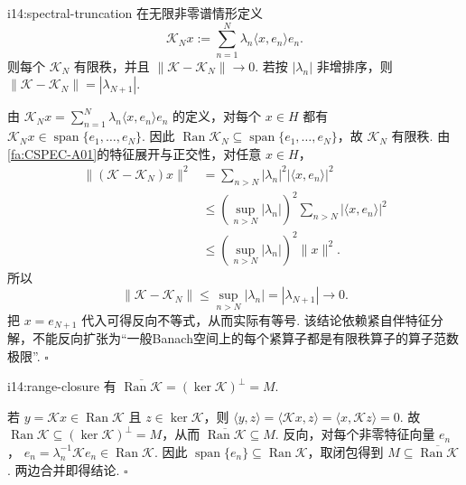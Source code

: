 \begin{FAProposition}[B][谱有限秩截断]{i14:spectral-truncation}
在无限非零谱情形定义
\[
\mathcal K_Nx
:=
\sum_{n=1}^{N}
\lambda_n\langle x,e_n\rangle e_n.
\]
则每个 \(\displaystyle \mathcal K_N\) 有限秩，并且
\(\displaystyle \|\mathcal K-\mathcal K_N\| \to0\).
若按 \(\displaystyle |\lambda_n|\) 非增排序，则
\(\displaystyle \|\mathcal K-\mathcal K_N\| = |\lambda_{N+1}|\).
\end{FAProposition}

\begin{FAProof}
由 \(\displaystyle \mathcal K_Nx=\sum_{n=1}^N\lambda_n\langle x,e_n\rangle e_n\) 的定义，对每个 \(\displaystyle x\in H\) 都有 \(\displaystyle \mathcal K_Nx\in\operatorname{span}\{e_1,\dots,e_N\}\). 因此 \(\displaystyle \operatorname{Ran}\mathcal K_N\subseteq\operatorname{span}\{e_1,\dots,e_N\}\)，故 \(\displaystyle \mathcal K_N\) 有限秩. 由\autoref{fa:CSPEC-A01}的特征展开与正交性，对任意 \(\displaystyle x\in H\)，
\[
\begin{aligned}
\displaystyle \|(\mathcal K-\mathcal K_N)x\|^2
&\displaystyle =
\sum_{n>N}|\lambda_n|^2|\langle x,e_n\rangle|^2\\
&\displaystyle \leqslant
\left(\sup_{n>N}|\lambda_n|\right)^2
\sum_{n>N}|\langle x,e_n\rangle|^2\\
&\displaystyle \leqslant
\left(\sup_{n>N}|\lambda_n|\right)^2\|x\|^2.
\end{aligned}
\]
所以
\[
\|\mathcal K-\mathcal K_N\|
\leqslant
\sup_{n>N}|\lambda_n|
=
|\lambda_{N+1}|
\to0.
\]
把 \(\displaystyle x=e_{N+1}\) 代入可得反向不等式，从而实际有等号. 该结论依赖紧自伴特征分解，不能反向扩张为“一般Banach空间上的每个紧算子都是有限秩算子的算子范数极限”.
\hfill\(\square\)
\end{FAProof}

\begin{FAProposition}[B][值域闭包的谱描述]{i14:range-closure}
有
\(\displaystyle \overline{\operatorname{Ran}\mathcal K} = (\ker\mathcal K)^\perp = M\).
\end{FAProposition}

\begin{FAProof}
若 \(\displaystyle y=\mathcal Kx\in\operatorname{Ran}\mathcal K\) 且 \(\displaystyle z\in\ker\mathcal K\)，则
\(\displaystyle \langle y,z\rangle = \langle\mathcal Kx,z\rangle = \langle x,\mathcal Kz\rangle = 0\).
故 \(\displaystyle \operatorname{Ran}\mathcal K\subseteq(\ker\mathcal K)^\perp=M\)，从而 \(\displaystyle \overline{\operatorname{Ran}\mathcal K}\subseteq M\). 反向，对每个非零特征向量 \(\displaystyle e_n\)，
\(\displaystyle e_n = \lambda_n^{-1}\mathcal Ke_n \in \operatorname{Ran}\mathcal K\).
因此 \(\displaystyle \operatorname{span}\{e_n\}\subseteq\operatorname{Ran}\mathcal K\)，取闭包得到 \(\displaystyle M\subseteq\overline{\operatorname{Ran}\mathcal K}\). 两边合并即得结论.
\hfill\(\square\)
\end{FAProof}

